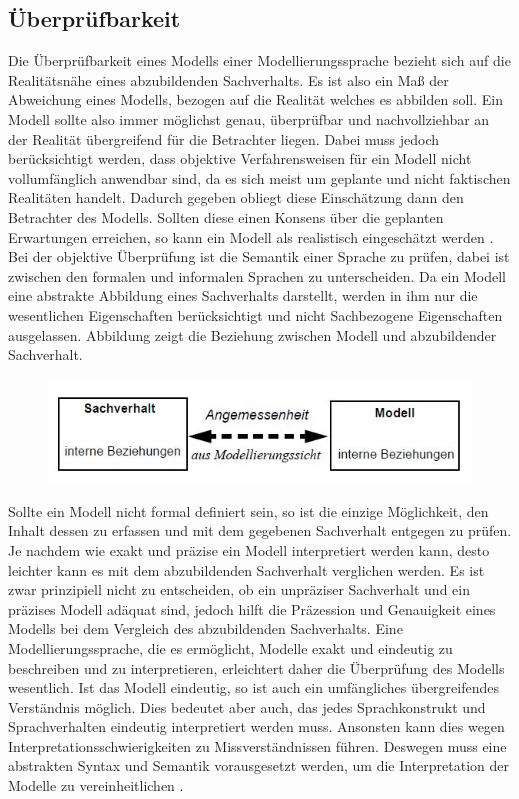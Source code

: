 \subsection{Überprüfbarkeit}
Die Überprüfbarkeit eines Modells einer Modellierungssprache bezieht sich auf die Realitätsnähe eines abzubildenden Sachverhalts. Es ist also ein Maß der Abweichung eines Modells, bezogen auf die Realität welches es abbilden soll.
Ein Modell sollte also immer möglichst genau, überprüfbar und nachvollziehbar an der Realität übergreifend für die Betrachter liegen. Dabei muss jedoch berücksichtigt werden, dass objektive Verfahrensweisen für ein Modell nicht vollumfänglich anwendbar sind, da es sich meist um geplante und nicht faktischen Realitäten handelt. Dadurch gegeben obliegt diese Einschätzung  dann den Betrachter des Modells. Sollten diese einen Konsens über die geplanten Erwartungen erreichen, so kann ein Modell als realistisch eingeschätzt werden \cite[3]{Becker_2012}. Bei der objektive Überprüfung ist die Semantik einer Sprache zu prüfen, dabei ist zwischen den formalen und informalen Sprachen zu unterscheiden. Da ein Modell eine abstrakte Abbildung eines Sachverhalts darstellt, werden in ihm nur die wesentlichen Eigenschaften berücksichtigt und nicht Sachbezogene Eigenschaften ausgelassen. Abbildung \pageref{fig:Beziehung} zeigt die Beziehung zwischen Modell und abzubildender Sachverhalt.
	\begin{figure}[h]
		\includegraphics[width=\textwidth]{Graphics/Sachverhalt.jpg}
		\label{fig:Beziehung}
	\end{figure}
Sollte ein Modell nicht formal definiert sein, so ist die einzige Möglichkeit, den Inhalt dessen zu erfassen und mit dem gegebenen Sachverhalt entgegen zu prüfen. Je nachdem wie exakt und präzise ein Modell interpretiert werden kann, desto leichter kann es mit dem abzubildenden Sachverhalt verglichen werden. Es ist zwar prinzipiell nicht zu entscheiden, ob ein unpräziser Sachverhalt und ein präzises Modell adäquat sind, jedoch hilft die Präzession und Genauigkeit eines Modells bei dem Vergleich des abzubildenden Sachverhalts. Eine Modellierungssprache, die es ermöglicht, Modelle exakt und eindeutig zu beschreiben
und zu interpretieren, erleichtert daher die Überprüfung des Modells wesentlich. Ist das Modell eindeutig, so ist auch ein umfängliches übergreifendes Verständnis möglich. Dies bedeutet aber auch, das jedes Sprachkonstrukt und Sprachverhalten eindeutig interpretiert werden muss. Ansonsten kann dies wegen Interpretationsschwierigkeiten zu Missverständnissen führen. Deswegen muss eine abstrakten Syntax und Semantik vorausgesetzt werden, um die Interpretation der Modelle zu vereinheitlichen \cite[35F]{Frank_1997}.
